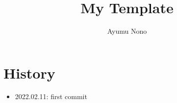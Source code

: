 \documentclass[dvipdfmx,autodetect-engine]{article}
\title{My Template}
\author{Ayumu Nono}
\begin{document}
\maketitle


\section{History}
\begin{itemize}
    \item 2022.02.11: first commit
\end{itemize}
\end{document}
